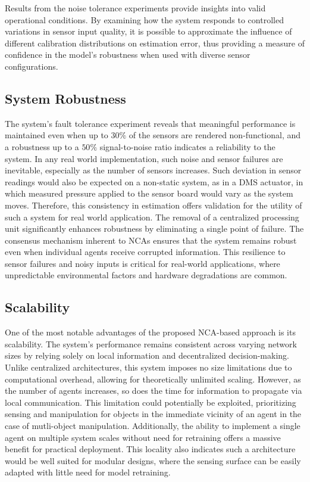 Results from the noise tolerance experiments provide insights into valid operational conditions. By examining how the system responds to controlled variations in sensor input quality, it is possible to approximate the influence of different calibration distributions on estimation error, thus providing a measure of confidence in the model’s robustness when used with diverse sensor configurations.


\subsection{System Robustness}

The system’s fault tolerance experiment reveals that meaningful performance is maintained even when up to $30\%$ of the sensors are rendered non-functional, and a robustness up to a $50\%$ signal-to-noise ratio indicates a reliability to the system. In any real world implementation, such noise and sensor failures are inevitable, especially as the number of sensors increases. Such deviation in sensor readings would also be expected on a non-static system, as in a \ac{DMS} actuator, in which measured pressure applied to the sensor board would vary as the system moves. Therefore, this consistency in estimation offers validation for the utility of such a system for real world application.
The removal of a centralized processing unit significantly enhances robustness by eliminating a single point of failure. The consensus mechanism inherent to \ac{NCA}s ensures that the system remains robust even when individual agents receive corrupted information. This resilience to sensor failures and noisy inputs is critical for real-world applications, where unpredictable environmental factors and hardware degradations are common.
 

\subsection{Scalability}
One of the most notable advantages of the proposed \ac{NCA}-based approach is its scalability. The system's performance remains consistent across varying network sizes by relying solely on local information and decentralized decision-making. Unlike centralized architectures, this system imposes no size limitations due to computational overhead, allowing for theoretically unlimited scaling. 
However, as the number of agents increases, so does the time for information to propagate via local communication. This limitation could potentially be exploited, prioritizing sensing and manipulation for objects in the immediate vicinity of an agent in the case of mutli-object manipulation.
Additionally, the ability to implement a single agent on multiple system scales without need for retraining offers a massive benefit for practical deployment. This locality also indicates such a architecture would be well suited for modular designs, where the sensing surface can be easily adapted with little need for model retraining.

